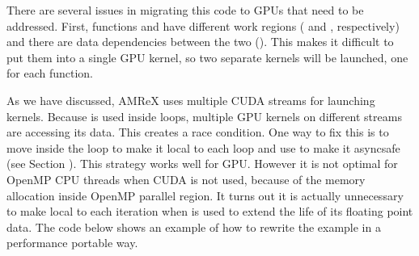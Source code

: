\documentclass[letterpaper,10pt,english]{sphinxmanual}
\begin{document}
\sphinxAtStartPar
There are several issues in migrating this code to GPUs that need to
be addressed.  First, functions  and  have different
work regions ( and , respectively) and there are data
dependencies between the two (). This makes it difficult to put
them into a single GPU kernel, so two separate kernels will be
launched, one for each function.

\sphinxAtStartPar
As we have discussed, AMReX uses multiple CUDA streams for launching
kernels.  Because  is used inside  loops, multiple
GPU kernels on different streams are accessing its data.  This creates
a race condition.  One way to fix this is to move 
inside the loop to make it local to each loop and use  to
make it async\sphinxhyphen{}safe (see Section {\hyperref[\detokenize{GPU:sec-gpu-classes-elixir}]{}}).  This
strategy works well for GPU.  However it is not optimal for OpenMP CPU
threads when CUDA is not used, because of the memory allocation inside
OpenMP parallel region.  It turns out it is actually unnecessary to
make  local to each iteration when  is
used to extend the life of its floating point data.  The code below
shows an example of how to rewrite the example in a performance
portable way.
\end{document}
